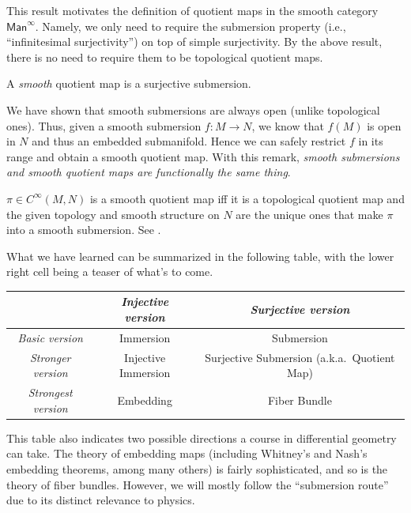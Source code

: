 This result motivates the definition of quotient maps in the smooth category $\mathsf{Man}^\infty$. Namely, we only need to require the submersion property (i.e., ``infinitesimal surjectivity'') on top of simple surjectivity. By the above result, there is no need to require them to be topological quotient maps.

\begin{defn}
A \emph{smooth} quotient map is a surjective submersion.
\end{defn}

We have shown that smooth submersions are always open (unlike topological ones). Thus, given a smooth submersion $f:M\to N$, we know that $f(M)$ is open in $N$ and thus an embedded submanifold. Hence we can safely restrict $f$ in its range and obtain a smooth quotient map. With this remark, \emph{smooth submersions and smooth quotient maps are functionally the same thing}.

\begin{rem}
    $\pi\in C^\infty(M,N)$ is a smooth quotient map iff it is a topological quotient map and the given topology and smooth structure on $N$ are the unique ones that make $\pi$ into a smooth submersion. See \cite[Problem 4-7]{Lee}.
\end{rem}

What we have learned can be summarized in the following table, with the lower right cell being a teaser of what's to come.

\begin{center}
\begin{tabular}{ccc}
    & \emph{Injective version} & \emph{Surjective version} \\
    \toprule
    \emph{Basic version} & Immersion & Submersion  \\
    \midrule
    \emph{Stronger version}  & Injective Immersion & Surjective Submersion (a.k.a.~Quotient Map) \\
    \midrule
    \emph{Strongest version}  & Embedding & Fiber Bundle \\
    \bottomrule
\end{tabular}
\end{center}
 
 This table also indicates two possible directions a course in differential geometry can take. The theory of embedding maps (including Whitney's and Nash's embedding theorems, among many others) is fairly sophisticated, and so is the theory of fiber bundles. However, we will mostly follow the ``submersion route'' due to its distinct relevance to physics.







